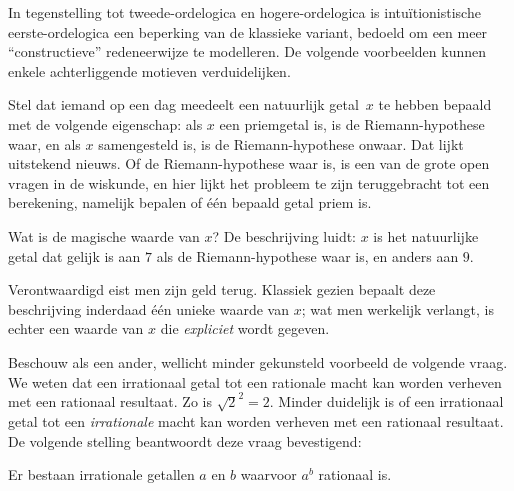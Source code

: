 \documentclass[openany]{memoir}
\begin{document}
\begingroup
\def\olfilename{OLP-0179}
\def\olfilepath{content/first-order-logic/beyond/}
\hypertarget{unit-OLP-0179}{}





In tegenstelling tot tweede-ordelogica en hogere-ordelogica is
intuïtionistische eerste-ordelogica een beperking van de klassieke variant,
bedoeld om een meer ``constructieve'' redeneerwijze te modelleren. De volgende
voorbeelden kunnen enkele achterliggende motieven verduidelijken.

Stel dat iemand op een dag meedeelt een natuurlijk getal~$x$ te hebben bepaald
met de volgende eigenschap: als $x$ een priemgetal is, is de Riemann-hypothese
waar, en als $x$ samengesteld is, is de Riemann-hypothese onwaar. Dat lijkt
uitstekend nieuws. Of de Riemann-hypothese waar is, is een van de grote open
vragen in de wiskunde, en hier lijkt het probleem te zijn teruggebracht tot een
berekening, namelijk bepalen of één bepaald getal priem is.

Wat is de magische waarde van $x$? De beschrijving luidt: $x$ is het natuurlijke
getal dat gelijk is aan $7$ als de Riemann-hypothese waar is, en anders aan $9$.

Verontwaardigd eist men zijn geld terug. Klassiek gezien bepaalt deze
beschrijving inderdaad één unieke waarde van $x$; wat men werkelijk verlangt,
is echter een waarde van $x$ die \emph{expliciet} wordt gegeven.

Beschouw als een ander, wellicht minder gekunsteld voorbeeld de volgende vraag.
We weten dat een irrationaal getal tot een rationale macht kan worden verheven
met een rationaal resultaat. Zo is $\sqrt{2}^2 = 2$. Minder duidelijk is of een
irrationaal getal tot een \emph{irrationale} macht kan worden verheven met een
rationaal resultaat. De volgende stelling beantwoordt deze vraag bevestigend:

\begin{thm}
Er bestaan irrationale getallen $a$ en $b$ waarvoor $a^b$ rationaal is.
\end{thm}
\end{document}
